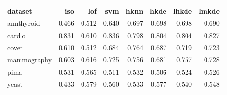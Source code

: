 \begin{tabular}{l|rrr|rrrr}
  \toprule
dataset & iso & lof & svm & hknn & hkde & lhkde & lmkde \\ 
  \midrule
annthyroid & 0.466 & 0.512 & 0.640 & 0.697 & 0.698 & 0.698 & 0.690 \\ 
  cardio & 0.831 & 0.610 & 0.836 & 0.798 & 0.804 & 0.804 & 0.827 \\ 
  cover & 0.610 & 0.512 & 0.684 & 0.764 & 0.687 & 0.719 & 0.723 \\ 
  mammography & 0.603 & 0.616 & 0.725 & 0.756 & 0.681 & 0.757 & 0.728 \\ 
  pima & 0.531 & 0.565 & 0.511 & 0.532 & 0.506 & 0.524 & 0.526 \\ 
  yeast & 0.433 & 0.579 & 0.560 & 0.533 & 0.577 & 0.540 & 0.548 \\ 
   \bottomrule
\end{tabular}
